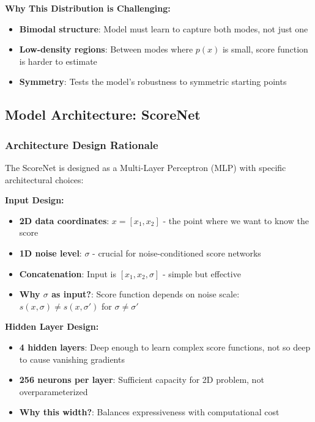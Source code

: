 \documentclass[12pt,a4paper]{article}
\begin{document}
\textbf{Why This Distribution is Challenging:}
\begin{itemize}
    \item \textbf{Bimodal structure}: Model must learn to capture both modes, not just one
    \item \textbf{Low-density regions}: Between modes where $p(x)$ is small, score function is harder to estimate
    \item \textbf{Symmetry}: Tests the model's robustness to symmetric starting points
\end{itemize}

\subsection{Model Architecture: ScoreNet}

\subsubsection{Architecture Design Rationale}

The ScoreNet is designed as a Multi-Layer Perceptron (MLP) with specific architectural choices:

\textbf{Input Design:}
\begin{itemize}
    \item \textbf{2D data coordinates}: $x = [x_1, x_2]$ - the point where we want to know the score
    \item \textbf{1D noise level}: $\sigma$ - crucial for noise-conditioned score networks
    \item \textbf{Concatenation}: Input is $[x_1, x_2, \sigma]$ - simple but effective
    \item \textbf{Why $\sigma$ as input?}: Score function depends on noise scale: $s(x, \sigma) \neq s(x, \sigma')$ for $\sigma \neq \sigma'$
\end{itemize}

\textbf{Hidden Layer Design:}
\begin{itemize}
    \item \textbf{4 hidden layers}: Deep enough to learn complex score functions, not so deep to cause vanishing gradients
    \item \textbf{256 neurons per layer}: Sufficient capacity for 2D problem, not overparameterized
    \item \textbf{Why this width?}: Balances expressiveness with computational cost
\end{itemize}
\end{document}
